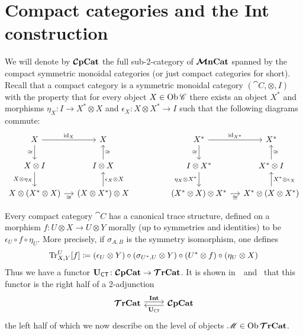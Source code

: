 \documentclass[11pt,oneside,article]{memoir}
\begin{document}
\section{Compact categories and the Int construction}\label{sec:compact_and_int}

We will denote by $\bm{\mathcal{C}}\mathbf{pCat}$ the full sub-2-category of $\bm{\mathcal{M}}\mathbf{nCat}$ spanned by the compact symmetric
monoidal categories (or just compact categories for short).  Recall that a compact category is a
symmetric monoidal category $(\cat{C},\otimes,I)$ with the property that for every object
$X\in\operatorname{Ob}\mathscr{C}$ there exists an object $X^*$ and morphisms $\eta_X\colon I\to X^*\otimes X$ and
$\epsilon_X\colon X\otimes X^*\to I$ such that the following diagrams commute:
\begin{equation*}
   \begin{tikzcd}[column sep=small]
      X\arrow[r,"\id_X"]\arrow[d,"\cong"'] & X \\
      X\otimes I\arrow[d,"X\otimes\eta_X"'] & I\otimes X\arrow[u,"\cong"'] \\
      X\otimes(X^*\otimes X)\arrow[r,"\cong"'] & (X\otimes X^*)\otimes X\arrow[u,"\epsilon_X\otimes X"']
   \end{tikzcd}
   \hspace{.6in}
   \begin{tikzcd}[column sep=small]
      X^*\arrow[r,"\id_{X^*}"]\arrow[d,"\cong"'] & X^*\\
      I\otimes X^*\arrow[d,"\eta_X\otimes X^*"'] & X^*\otimes I\arrow[u,"\cong"'] \\
      (X^*\otimes X)\otimes X^*\arrow[r,"\cong"'] & X^*\otimes (X\otimes X^*)\arrow[u,"X^*\otimes\epsilon_X"']
   \end{tikzcd}
\end{equation*}

Every compact category $\cat{C}$ has a canonical trace structure, defined on a morphism $f\colon
U\otimes X\to U\otimes Y$ morally (up to symmetries and identities) to be $\epsilon_U\circ f\circ \eta_U$. More precisely, if
$\sigma_{A,B}$ is the symmetry isomorphism, one defines
\begin{equation*}
   \operatorname{Tr}^U_{X,Y}[f]\coloneqq(\epsilon_U\otimes Y)\circ (\sigma_{U^*,U}\otimes Y)\circ (U^*\otimes f)\circ (\eta_U\otimes X)
\end{equation*}
Thus we have a functor $\mathbf{U}_{\mathsf{CT}}\colon\bm{\mathcal{C}}\mathbf{pCat}\to\bm{\mathcal{T}}\mathbf{rCat}$. It is shown in~\cite{JoyalStreetVerity}~and~\cite{HK} that
this functor is the right half of a 2-adjunction
\begin{equation}\label{dia:traced_compact_adjunction}
\begin{tikzcd}
   \TTrCat\arrow[r,shift left=.5ex, "\Int"]&\CCompCat\arrow[l,shift left=.5ex,"\UCT"]
\end{tikzcd}
\end{equation}
the left half of which we now describe on the level of objects $\mathscr{M}\in\operatorname{Ob}\bm{\mathcal{T}}\mathbf{rCat}$.
\end{document}
